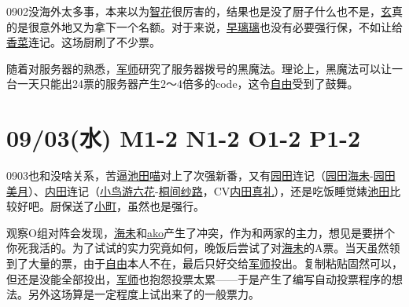 0902没海外太多事，本来以为\uline{智花}很厉害的，结果也是没了厨子什么也不是，\uline{玄}真的是很意外地又为拿下一个名额。对于来说，\uline{早璃璃}也没有必要强行保，不如让给\uline{香菜}连记。这场厨刷了不少票。

随着对服务器的熟悉，\uline{军师}研究了服务器拨号的黑魔法。理论上，黑魔法可以让一台一天只能出24票的服务器产生2〜4倍多的code，这令\uline{自由}受到了鼓舞。

\section{09/03(水) M1-2 N1-2 O1-2 P1-2}


0903也和没啥关系，苦逼\uline{池田喵}对上了次强新番，又有\uline{园田}连记（\uline{园田海未}-\uline{园田美月}）、\uline{内田}连记（\uline{小鸟游六花}-\uline{桐间纱路}，CV\uline{内田真礼}），还是吃饭睡觉婊\uline{池田}比较好吧。厨保送了\uline{小町}，虽然也是强行。

观察O组对阵会发现，\uline{海未}和\uline{ako}产生了冲突，作为和两家的主力，想见是要拼个你死我活的。为了试试的实力究竟如何，晚饭后尝试了对\uline{海未}的A票。当天虽然领到了大量的票，由于\uline{自由}本人不在，最后只好交给\uline{军师}投出。复制粘贴固然可以，但还是没能全部投出，\uline{军师}也抱怨投票太累——于是产生了编写自动投票程序的想法。另外这场算是一定程度上试出来了的一般票力。

